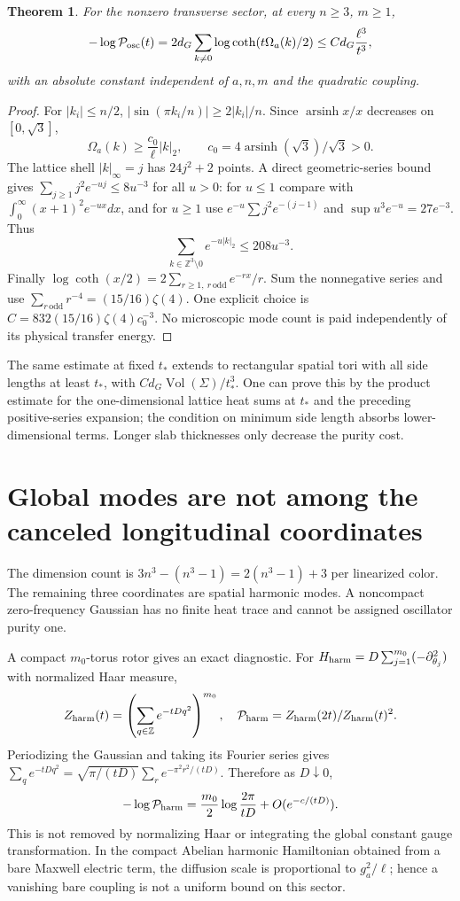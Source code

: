 \documentclass{article}
\newtheorem{theorem}{Theorem}
\begin{document}
\begin{theorem}
For the nonzero transverse sector, at every $n\ge3$, $m\ge1$,
\[
 -\log\mathcal P_{\rm osc}(t)
 =2d_G\sum_{k\ne0}\log\coth(t\Omega_a(k)/2)
 \le C d_G\frac{\ell^3}{t^3},
\]
with an absolute constant independent of $a,n,m$ and the quadratic coupling.
\end{theorem}
\begin{proof}
For $|k_i|\le n/2$, $|\sin(\pi k_i/n)|\ge2|k_i|/n$. Since $\operatorname{arsinh}x/x$ decreases on $[0,\sqrt3]$,
\[
 \Omega_a(k)\ge\frac{c_0}{\ell}|k|_2,
 \qquad c_0=4\operatorname{arsinh}(\sqrt3)/\sqrt3>0.
\]
The lattice shell $|k|_\infty=j$ has $24j^2+2$ points. A direct geometric-series bound gives $\sum_{j\ge1}j^2e^{-uj}\le8u^{-3}$ for all $u>0$: for $u\le1$ compare with $\int_0^\infty(x+1)^2e^{-ux}dx$, and for $u\ge1$ use $e^{-u}\sum j^2e^{-(j-1)}$ and $\sup u^3e^{-u}=27e^{-3}$. Thus
\[
 \sum_{k\in\mathbb Z^3\setminus0}e^{-u|k|_2}\le208u^{-3}.
\]
Finally $\log\coth(x/2)=2\sum_{r\ge1,\ r\,\mathrm{odd}}e^{-rx}/r$. Sum the nonnegative series and use $\sum_{r\,\mathrm{odd}}r^{-4}=(15/16)\zeta(4)$. One explicit choice is $C=832(15/16)\zeta(4)c_0^{-3}$. No microscopic mode count is paid independently of its physical transfer energy.
\end{proof}

The same estimate at fixed $t_*$ extends to rectangular spatial tori with all side lengths at least $t_*$, with $C d_G\operatorname{Vol}(\Sigma)/t_*^3$. One can prove this by the product estimate for the one-dimensional lattice heat sums at $t_*$ and the preceding positive-series expansion; the condition on minimum side length absorbs lower-dimensional terms. Longer slab thicknesses only decrease the purity cost.

\section*{Global modes are not among the canceled longitudinal coordinates}
The dimension count is $3n^3-(n^3-1)=2(n^3-1)+3$ per linearized color. The remaining three coordinates are spatial harmonic modes. A noncompact zero-frequency Gaussian has no finite heat trace and cannot be assigned oscillator purity one.

A compact $m_0$-torus rotor gives an exact diagnostic. For $H_{\rm harm}=D\sum_{j=1}^{m_0}(-\partial_{\theta_j}^2)$ with normalized Haar measure,
\[
 Z_{\rm harm}(t)=\left(\sum_{q\in\mathbb Z}e^{-tDq^2}\right)^{m_0},
 \quad\mathcal P_{\rm harm}=Z_{\rm harm}(2t)/Z_{\rm harm}(t)^2.
\]
Periodizing the Gaussian and taking its Fourier series gives
$\sum_qe^{-tDq^2}=\sqrt{\pi/(tD)}\sum_re^{-\pi^2r^2/(tD)}$. Therefore as $D\downarrow0$,
\[
 -\log\mathcal P_{\rm harm}
 =\frac{m_0}{2}\log\frac{2\pi}{tD}+O(e^{-c/(tD)}).
\]
This is not removed by normalizing Haar or integrating the global constant gauge transformation. In the compact Abelian harmonic Hamiltonian obtained from a bare Maxwell electric term, the diffusion scale is proportional to $g_a^2/\ell$; hence a vanishing bare coupling is not a uniform bound on this sector.
\end{document}

